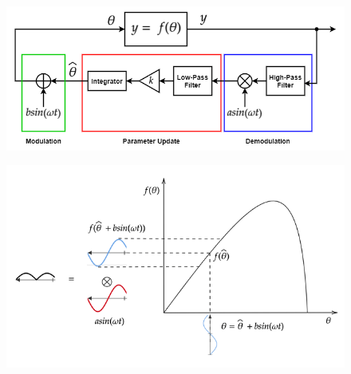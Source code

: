 \documentclass[nohyperref]{article}
\theoremstyle{plain}
\theoremstyle{definition}
\theoremstyle{remark}
\begin{document}
\begin{figure}[ht]
\vskip 0.2in
\begin{center}
\centerline{\includegraphics[width=\columnwidth]{images/esc_static_optimization.png}}
\caption{}
\end{center}
\vskip -0.2in
\end{figure}

\begin{figure}[ht]
\vskip 0.2in
\begin{center}
\centerline{\includegraphics[width=\columnwidth]{images/esc_increasing_objective.png}}
\caption{}
\end{center}
\vskip -0.2in
\end{figure}
\end{document}
